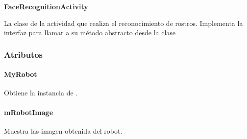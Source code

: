\textbf{FaceRecognitionActivity}
\label{\detokenize{dev_docs:facerecognitionactivity}}

\begin{fulllineitems}
\label{\detokenize{dev_docs:com.lar.cloudnao.FaceRecognitionActivity}}
La clase de la actividad que realiza el reconocimiento de rostros. Implementa la interfaz  para llamar a su método abstracto desde la clase 

\end{fulllineitems}



\subsubsection{Atributos}
\label{\detokenize{dev_docs:id15}}

\paragraph{MyRobot}
\label{\detokenize{dev_docs:id16}}

\begin{fulllineitems}
\label{\detokenize{dev_docs:com.lar.cloudnao.FaceRecognitionActivity.MyRobot}}
Obtiene la instancia de {\hyperref[\detokenize{dev_docs:com.lar.cloudnao.Robot}]{}}.

\end{fulllineitems}



\paragraph{mRobotImage}
\label{\detokenize{dev_docs:mrobotimage}}

\begin{fulllineitems}
\label{\detokenize{dev_docs:com.lar.cloudnao.FaceRecognitionActivity.mRobotImage}}
Muestra las imagen obtenida del robot.

\end{fulllineitems}



